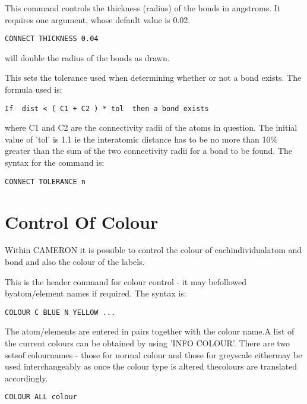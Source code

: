 \documentclass[10pt,a4paper]{report}
\begin{document}
This command controls the thickness (radius) of the bonds in
angstroms. It
requires one argument, whose default value is 0.02.
\small\begin{verbatim}
CONNECT THICKNESS 0.04
\end{verbatim}\normalsize


will double the radius of the bonds as drawn.


\bigskip{}




This sets the tolerance used when determining whether or not
a bond
exists. The formula used is:
\small\begin{verbatim}
If  dist < ( C1 + C2 ) * tol  then a bond exists
\end{verbatim}\normalsize


where C1 and C2 are the connectivity radii of the atoms in
question.
The initial value of 'tol' is 1.1 ie the interatomic distance has
to be no
more than 10\% greater than the sum of the two connectivity radii
for a
bond to be found. The syntax for the command is:
\small\begin{verbatim}
CONNECT TOLERANCE n
\end{verbatim}\normalsize


\chapter{Control Of Colour}

Within CAMERON it is possible to control the colour of eachindividualatom and bond and also the colour of the labels.

\bigskip{}

This is the header command for colour control - it may befollowed byatom/element names if required. The syntax is:\small\begin{verbatim}COLOUR C BLUE N YELLOW ...\end{verbatim}\normalsize

The atom/elements are entered in pairs together with the colour name.A list of the current colours can be obtained by using 'INFO COLOUR'. There are two setsof colournames - those for normal colour and those for greyscale eithermay be used interchangeably as once the colour type is altered thecolours are translated accordingly.\small\begin{verbatim}COLOUR ALL colour\end{verbatim}\normalsize
\end{document}
